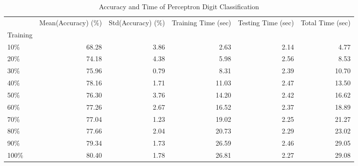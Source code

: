 \documentclass[10pt,parskip=half,
toc=sectionentrywithdots,
bibliography=totocnumbered,
captions=tableheading,numbers=noendperiod]{scrartcl}
\begin{document}
\begin{table}[H]
\caption{Accuracy and Time of Perceptron Digit Classification}\label{tbl:tlabel}
\centering
\begin{adjustbox}{max width=\textwidth}
\begin{tabular}{lrrrrr}
\toprule
{} &  Mean(Accuracy) (\%) &  Std(Accuracy) (\%) &  Training Time (sec) &  Testing Time (sec) &  Total Time (sec) \\
Training &                     &                    &                      &                     &                   \\
\midrule
10\%      &               68.28 &               3.86 &                 2.63 &                2.14 &              4.77 \\
20\%      &               74.18 &               4.38 &                 5.98 &                2.56 &              8.53 \\
30\%      &               75.96 &               0.79 &                 8.31 &                2.39 &             10.70 \\
40\%      &               78.16 &               1.71 &                11.03 &                2.47 &             13.50 \\
50\%      &               76.30 &               3.76 &                14.20 &                2.42 &             16.62 \\
60\%      &               77.26 &               2.67 &                16.52 &                2.37 &             18.89 \\
70\%      &               77.04 &               1.23 &                19.02 &                2.25 &             21.27 \\
80\%      &               77.66 &               2.04 &                20.73 &                2.29 &             23.02 \\
90\%      &               79.34 &               1.73 &                26.59 &                2.46 &             29.05 \\
100\%     &               80.40 &               1.78 &                26.81 &                2.27 &             29.08 \\
\bottomrule
\end{tabular}

\end{adjustbox}
\end{table}

\begin{figure}[H]\begin{center}\end{center}\label{fig:flabel}\end{figure}
\end{document}
